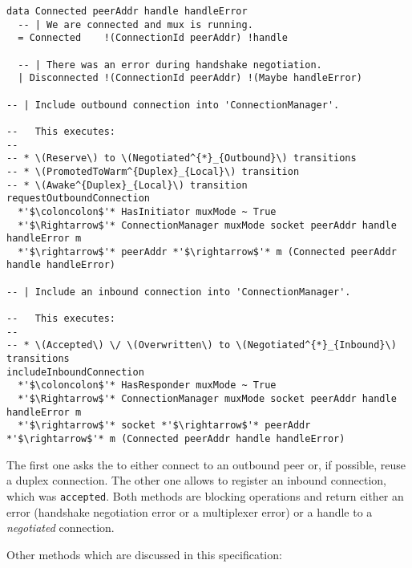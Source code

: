 \begin{lstlisting}
data Connected peerAddr handle handleError
  -- | We are connected and mux is running.
  = Connected    !(ConnectionId peerAddr) !handle

  -- | There was an error during handshake negotiation.
  | Disconnected !(ConnectionId peerAddr) !(Maybe handleError)

-- | Include outbound connection into 'ConnectionManager'.

--   This executes:
--
-- * \(Reserve\) to \(Negotiated^{*}_{Outbound}\) transitions
-- * \(PromotedToWarm^{Duplex}_{Local}\) transition
-- * \(Awake^{Duplex}_{Local}\) transition
requestOutboundConnection
  *'$\coloncolon$'* HasInitiator muxMode ~ True
  *'$\Rightarrow$'* ConnectionManager muxMode socket peerAddr handle handleError m
  *'$\rightarrow$'* peerAddr *'$\rightarrow$'* m (Connected peerAddr handle handleError)

-- | Include an inbound connection into 'ConnectionManager'.

--   This executes:
--
-- * \(Accepted\) \/ \(Overwritten\) to \(Negotiated^{*}_{Inbound}\) transitions
includeInboundConnection
  *'$\coloncolon$'* HasResponder muxMode ~ True
  *'$\Rightarrow$'* ConnectionManager muxMode socket peerAddr handle handleError m
  *'$\rightarrow$'* socket *'$\rightarrow$'* peerAddr *'$\rightarrow$'* m (Connected peerAddr handle handleError)
\end{lstlisting}

The first one asks the \connmngr{} to either connect to an outbound peer or, if
possible, reuse a duplex connection. The other one allows to register an
inbound connection, which was \texttt{accepted}. Both methods are blocking
operations and return either an error (handshake negotiation error or
a multiplexer error) or a handle to a \textit{negotiated} connection.

Other methods which are discussed in this specification:

